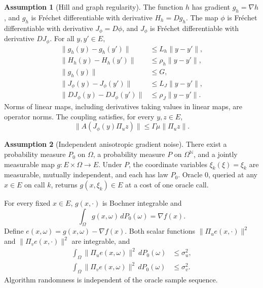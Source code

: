 \documentclass[10pt]{article}
\theoremstyle{definition}
\newtheorem{assumption}{Assumption}
\begin{document}
\begin{assumption}[Hill and graph regularity]
The function $h$ has gradient $g_h=\nabla h$, and $g_h$ is Fr\'echet differentiable with derivative $H_h=Dg_h$. The map $\phi$ is Fr\'echet differentiable with derivative $J_\phi=D\phi$, and $J_\phi$ is Fr\'echet differentiable with derivative $DJ_\phi$. For all $y,y'\in E$,
\[
\begin{aligned}
\|g_h(y)-g_h(y')\|&\leq L_h\|y-y'\|,\\
\|H_h(y)-H_h(y')\|&\leq\rho_h\|y-y'\|,\\
\|g_h(y)\|&\leq G,\\
\|J_\phi(y)-J_\phi(y')\|&\leq L_J\|y-y'\|,\\
\|DJ_\phi(y)-DJ_\phi(y')\|&\leq\rho_J\|y-y'\|.
\end{aligned}
\]
Norms of linear maps, including derivatives taking values in linear maps, are operator norms. The coupling satisfies, for every $y,z\in E$,
\[
\|A(J_\phi(y)\Pi_uz)\|\leq\Gamma\mu\|\Pi_uz\|.
\]
\end{assumption}

\begin{assumption}[Independent anisotropic gradient noise]
There exist a probability measure $P_0$ on $\Omega$, a probability measure $P$ on $\Omega^{\mathbb{N}}$, and a jointly measurable map $g:E\times\Omega\to E$. Under $P$, the coordinate variables $\xi_k(\xi)=\xi_k$ are measurable, mutually independent, and each has law $P_0$. Oracle $0$, queried at any $x\in E$ on call $k$, returns $g(x,\xi_k)\in E$ at a cost of one oracle call.

For every fixed $x\in E$, $g(x,\cdot)$ is Bochner integrable and
\[
\int_{\Omega}g(x,\omega)\,dP_0(\omega)=\nabla f(x).
\]
Define $e(x,\omega)=g(x,\omega)-\nabla f(x)$. Both scalar functions $\|\Pi_ue(x,\cdot)\|^2$ and $\|\Pi_ve(x,\cdot)\|^2$ are integrable, and
\[
\begin{aligned}
\int_{\Omega}\|\Pi_ue(x,\omega)\|^2\,dP_0(\omega)&\leq\sigma_u^2,\\
\int_{\Omega}\|\Pi_ve(x,\omega)\|^2\,dP_0(\omega)&\leq\sigma_v^2.
\end{aligned}
\]
Algorithm randomness is independent of the oracle sample sequence.
\end{assumption}
\end{document}
